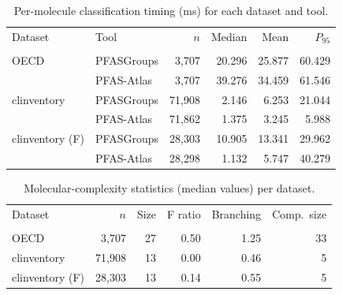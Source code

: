 \begin{table}[htbp]
\centering
\caption{Per-molecule classification timing (ms) for each dataset and tool.}
\label{tab:oecd_clinventory_timing}
\begin{tabular}{llrrrr}
\toprule
Dataset & Tool & $n$ & Median & Mean & $P_{95}$ \\\\
\midrule
OECD & PFASGroups & 3,707 & 20.296 & 25.877 & 60.429 \\
 & PFAS-Atlas & 3,707 & 39.276 & 34.459 & 61.546 \\
\midrule
clinventory & PFASGroups & 71,908 & 2.146 & 6.253 & 21.044 \\
 & PFAS-Atlas & 71,862 & 1.375 & 3.245 & 5.988 \\
\midrule
clinventory (F) & PFASGroups & 28,303 & 10.905 & 13.341 & 29.962 \\
 & PFAS-Atlas & 28,298 & 1.132 & 5.747 & 40.279 \\
\bottomrule
\end{tabular}
\end{table}

\begin{table}[htbp]
\centering
\caption{Molecular-complexity statistics (median values) per dataset.}
\label{tab:oecd_clinventory_complexity}
\begin{tabular}{lrrrrr}
\toprule
Dataset & $n$ & Size & F ratio & Branching & Comp.\ size \\\\
\midrule
OECD & 3,707 & 27 & 0.50 & 1.25 & 33 \\
clinventory & 71,908 & 13 & 0.00 & 0.46 & 5 \\
clinventory (F) & 28,303 & 13 & 0.14 & 0.55 & 5 \\
\bottomrule
\end{tabular}
\end{table}
